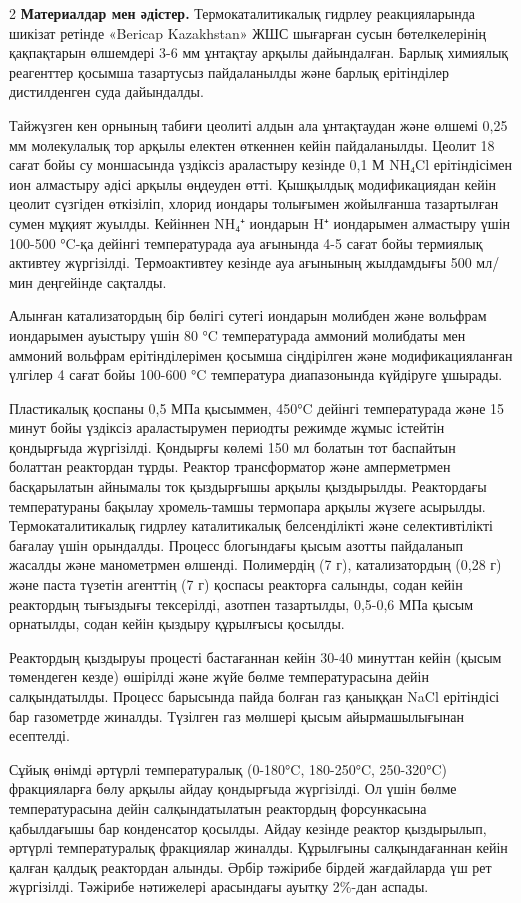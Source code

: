 \begin{multicols}{2}
{\bfseries Материалдар мен әдістер.} Термокаталитикалық гидрлеу
реакцияларында шикізат ретінде «Bericap Kazakhstan» ЖШС шығарған сусын
бөтелкелерінің қақпақтарын өлшемдері 3-6 мм ұнтақтау арқылы дайындалған.
Барлық химиялық реагенттер қосымша тазартусыз пайдаланылды және барлық
ерітінділер дистилденген суда дайындалды.

Тайжүзген кен орнының табиғи цеолиті алдын ала ұнтақтаудан және өлшемі
0,25 мм молекулалық тор арқылы електен өткеннен кейін пайдаланылды.
Цеолит 18 сағат бойы су моншасында үздіксіз араластыру кезінде 0,1 М
NH₄Cl ерітіндісімен ион алмастыру әдісі арқылы өңдеуден өтті. Қышқылдық
модификациядан кейін цеолит сүзгіден өткізіліп, хлорид иондары толығымен
жойылғанша тазартылған сумен мұқият жуылды. Кейіннен NH₄⁺ иондарын H⁺
иондарымен алмастыру үшін 100-500 °C-қа дейінгі температурада ауа
ағынында 4-5 сағат бойы термиялық активтеу жүргізілді. Термоактивтеу
кезінде ауа ағынының жылдамдығы 500 мл/мин деңгейінде сақталды.

Алынған катализатордың бір бөлігі сутегі иондарын молибден және вольфрам
иондарымен ауыстыру үшін 80 °C температурада аммоний молибдаты мен
аммоний вольфрам ерітінділерімен қосымша сіңдірілген және
модификацияланған үлгілер 4 сағат бойы 100-600 °C температура
диапазонында күйдіруге ұшырады.

Пластикалық қоспаны 0,5 МПа қысыммен, 450°C дейінгі температурада және
15 минут бойы үздіксіз араластырумен периодты режимде жұмыс істейтін
қондырғыда жүргізілді. Қондырғы көлемі 150 мл болатын тот баспайтын
болаттан реактордан тұрды. Реактор трансформатор және амперметрмен
басқарылатын айнымалы ток қыздырғышы арқылы қыздырылды. Реактордағы
температураны бақылау хромель-тамшы термопара арқылы жүзеге асырылды.
Термокаталитикалық гидрлеу каталитикалық белсенділікті және
селективтілікті бағалау үшін орындалды. Процесс блогындағы қысым азотты
пайдаланып жасалды және манометрмен өлшенді. Полимердің (7 г),
катализатордың (0,28 г) және паста түзетін агенттің (7 г) қоспасы
реакторға салынды, содан кейін реактордың тығыздығы тексерілді, азотпен
тазартылды, 0,5-0,6 МПа қысым орнатылды, содан кейін қыздыру құрылғысы
қосылды.

Реактордың қыздыруы процесті бастағаннан кейін 30-40 минуттан кейін
(қысым төмендеген кезде) өшірілді және жүйе бөлме температурасына дейін
салқындатылды. Процесс барысында пайда болған газ қаныққан NaCl
ерітіндісі бар газометрде жиналды. Түзілген газ мөлшері қысым
айырмашылығынан есептелді.

Сұйық өнімді әртүрлі температуралық (0-180°C, 180-250°C, 250-320°C)
фракцияларға бөлу арқылы айдау қондырғыда жүргізілді. Ол үшін бөлме
температурасына дейін салқындатылатын реактордың форсункасына
қабылдағышы бар конденсатор қосылды. Айдау кезінде реактор қыздырылып,
әртүрлі температуралық фракциялар жиналды. Құрылғыны салқындағаннан
кейін қалған қалдық реактордан алынды. Әрбір тәжірибе бірдей жағдайларда
үш рет жүргізілді. Тәжірибе нәтижелері арасындағы ауытқу 2\%-дан аспады.


\end{multicols}
